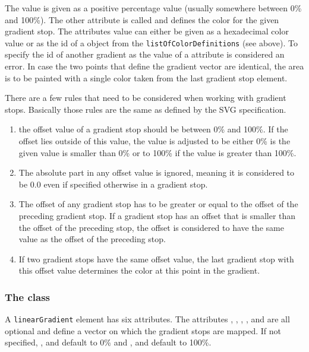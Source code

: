 The value is given as a positive percentage value
(usually somewhere between 0\% and 100\%). The other attribute is called
 and defines the color for the given gradient stop. The
attributes value can either be given as a hexadecimal color value or as the id
of a \ColorDefinition object from the \texttt{listOfColorDefinitions} (see above). 
To specify the id of another gradient as the value of a  attribute is 
considered an error.
In case the two points that define the gradient vector are identical, the area
is to be painted with a single color taken from the last gradient stop element.

There are a few rules that need to be considered when working with gradient stops.
Basically those rules are the same as defined by the SVG specification.

\begin{enumerate}
\item{the offset value of a gradient stop should be between 0\% and 100\%. If the offset lies outside of this value, the value is adjusted to be either 0\% is the given value is smaller than 0\% or to 100\% if the value is greater than 100\%.}
\item{The absolute part in any offset value is ignored, meaning it is considered to be 0.0 even if specified otherwise in a gradient stop.}
\item{The offset of any gradient stop has to be greater or equal to the offset of the preceding gradient stop. If a gradient stop has an offset that is smaller than the offset of the preceding stop, the offset is considered to have the same value as the offset of the preceding stop.}
\item{If two gradient stops have the same offset value, the last gradient stop with this offset value determines the color at this point in the gradient.}
\end{enumerate}

\subsubsection{The \LinearGradient class}
\label{lineargradient-class}

A \texttt{linear\-Gradient} element
has six attributes.
The attributes , ,
, ,  and  are all optional and
define a vector on which the gradient stops are mapped. If not specified,
,  and  default to 0\% and
, and  default to 100\%. 


